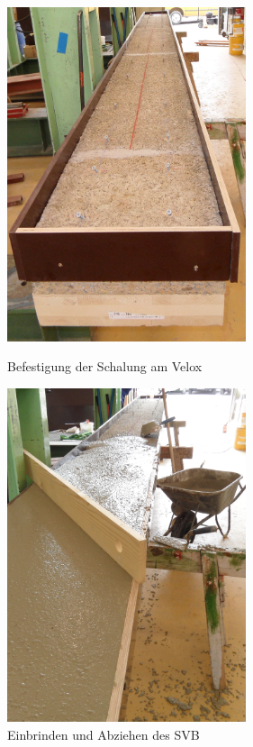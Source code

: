 \begin{figure}[h!]
\begin{minipage}[h]{7cm}	
	\includegraphics[width=7cm]{Aufbau/herstellung/einschalen.png}
	\caption{Befestigung der Schalung am Velox}
	\label{einschalen}
	
\end{minipage}
\hfill
\begin{minipage}[h]{7cm}
	\includegraphics[width=7cm]{Aufbau/herstellung/betonieren.png}
	\caption{Einbrinden und Abziehen des SVB}
	\label{betonieren}
\end{minipage}
\end{figure}

